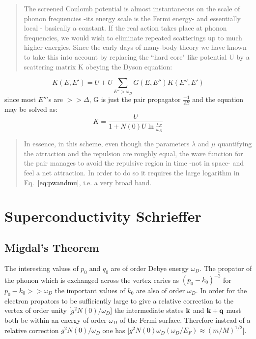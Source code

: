 \documentclass{article}
\def\k{{\bf k}}
\def\q{{\bf q}}
\begin{document}
\begin{quote}
The screened Coulomb potential is almost
instantaneous on the scale of phonon frequencies -its energy scale
is the Fermi energy- and essentially local - basically a constant.
If the real action takes place at phonon frequencies, 
we would wish to eliminate repeated
scatterings up to much higher energies. Since
the early days of many-body theory we have
known to take this into account
by replacing the ``hard core" like potential U by a 
scattering matrix K obeying the Dyson equation:
\end{quote}
%
\begin{equation}
K(E,E')=U + U\sum_{E'' > \omega_{D}} G(E,E'') K(E'',E')
\end{equation}
%
since most $E''$'s are $>> \Delta$, G is just the pair propagator $\frac{-1}{2E}$ and the equation 
may be solved as:
%
\begin{equation}
\label{eq:pwandmu}
K=\frac{U}{1+N(0)U\ln\frac{\epsilon_{F}}{\omega_{D}}}
\end{equation}
%
\begin{quote}
In essence, in this scheme, even though the parameters $\lambda$ and $\mu$ quantifying the
attraction and the repulsion are roughly equal, the wave function
for the pair manages to avoid the repulsive region in
time -not in space- and feel a net attraction.
In order to do so it requires the large logarithm
in Eq.~\ref{eq:pwandmu}, i.e. a very broad band.
\end{quote}

\section{Superconductivity Schrieffer}
\subsection{Migdal's Theorem}
\label{sec:migdal}
The interesting values of $p_{0}$ and $q_{0}$ are of order Debye energy $\omega_{D}$.
The propator of the phonon which is exchanged across the vertex caries as $(p_{0}-k_{0})^{-2}$
for $p_{0}-k_{0}>>\omega_{D}$ the important values of $k_{0}$ are also of order $\omega_{D}$. 
In order for the electron propators to be sufficiently large to
give a relative correction to the vertex of order unity [$g^{2}N(0)/\omega_{D}$] the
intermediate states $\k$ and $\k+\q$ must both be within an energy
of order $\omega_{D}$ of the Fermi surface. Therefore instead of a relative correction
$g^{2}N(0)/\omega_{D}$ one has [$g^{2}N(0)\omega_{D}(\omega_{D}/E_{F}) \approx (m/M)^{1/2}$].
\end{document}
